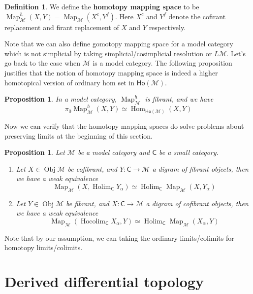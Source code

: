 \documentclass[11pt]{amsart}
\numberwithin{equation}{section}
\newtheorem{prop}[thm]{Proposition}
\theoremstyle{definition}
\newtheorem{defn}[thm]{Definition}
\theoremstyle{remark}
\numberwithin{equation}{section}
\newcommand{\CC}{{\mathsf C}}
\newcommand{\cm}{{\mathcal{M}}}
\newcommand{\ho}{\mathsf{Ho}}
\newcommand{\ob}{\operatorname{Obj}}
\newcommand{\Hom}{\operatorname{Hom}}
\newcommand{\map}{\operatorname{Map}}
\newcommand{\holim}{\operatorname{Holim}}
\newcommand{\hocolim}{\operatorname{Hocolim}}
\begin{document}
\begin{defn}
	We define the {\bf homotopy mapping space} to be $\map^h_{\cm} (X,Y) =\map_{\cm}(X^c, Y^f)$. Here $X^c$ and $Y^f$ denote the cofirant replacement and firant replacement of $X$ and $Y$ respectively.
\end{defn}
Note that we can also define gomotopy mapping space for a model category which is not simplicial by taking simplicial/cosimplicial resolution or $L\cm$. Let's go back to the case when $\cm$ is a model category. The following proposition justifies that the notion of homotopy mapping space is indeed a higher homotopical version of ordinary hom set in $\ho(\cm)$.
\begin{prop}
	In a model category, $\map^h_{\cm}$ is fibrant, and we have
	\begin{equation*}
	\pi_0 \map^h_{\cm}(X,Y) \simeq \Hom_{\ho(\cm)}(X,Y)
	\end{equation*}
\end{prop} 
Now we can verify that the homotopy mapping spaces do solve problems about preserving limits at the beginning of this section.
\begin{prop}Let $\cm$ be a model category and $\CC$ be a small category.
	\begin{enumerate}
		\item Let $X\in \ob\cm$ be cofibrant, and $Y: \CC \to \cm$ a digram of fibrant objects, then we have a weak equivalence
		\begin{equation*}
		\map_{\cm}(X, \holim_{\CC}Y_{\alpha} ) \simeq \holim_{\CC} \map_{\cm}(X, Y_{\alpha})
		\end{equation*}
		\item Let $Y\in \ob\cm$ be fibrant, and $X: \CC \to \cm$ a digram of cofibrant objects, then we have a weak equivalence
		\begin{equation*}
		\map_{\cm}(\hocolim_{\CC}X_{\alpha}, Y ) \simeq \holim_{\CC} \map_{\cm}(X_{\alpha}, Y)
		\end{equation*}
	\end{enumerate}
\end{prop}

Note that by our assumption, we can taking the ordinary limits/colimits for homotopy limits/colimits.
\section{Derived differential topology}
\end{document}

